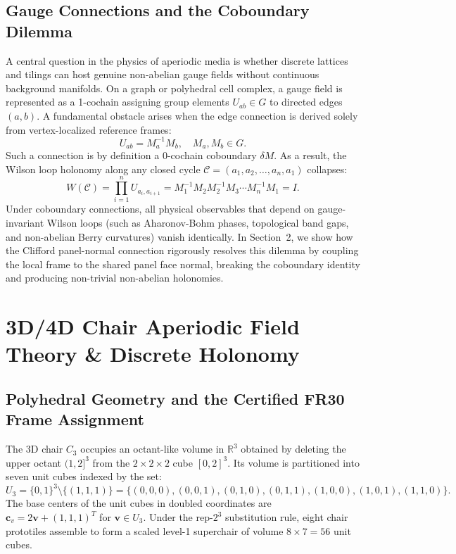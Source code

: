 \documentclass[11pt,a4paper]{article}
\theoremstyle{definition}
\newcommand{\R}{\mathbb{R}}
\begin{document}
\subsection{Gauge Connections and the Coboundary Dilemma}

A central question in the physics of aperiodic media is whether discrete lattices and tilings can host genuine non-abelian gauge fields without continuous background manifolds. On a graph or polyhedral cell complex, a gauge field is represented as a 1-cochain assigning group elements $U_{ab} \in G$ to directed edges $(a, b)$. A fundamental obstacle arises when the edge connection is derived solely from vertex-localized reference frames:
\begin{equation}
U_{ab} = M_a^{-1} M_b, \quad M_a, M_b \in G.
\end{equation}
Such a connection is by definition a 0-cochain coboundary $\delta M$. As a result, the Wilson loop holonomy along any closed cycle $\mathcal{C} = (a_1, a_2, \dots, a_n, a_1)$ collapses:
\begin{equation}
W(\mathcal{C}) = \prod_{i=1}^n U_{a_i, a_{i+1}} = M_1^{-1} M_2 M_2^{-1} M_3 \cdots M_n^{-1} M_1 = I.
\end{equation}
Under coboundary connections, all physical observables that depend on gauge-invariant Wilson loops (such as Aharonov-Bohm phases, topological band gaps, and non-abelian Berry curvatures) vanish identically. In Section~2, we show how the Clifford panel-normal connection rigorously resolves this dilemma by coupling the local frame to the shared panel face normal, breaking the coboundary identity and producing non-trivial non-abelian holonomies.

\section{3D/4D Chair Aperiodic Field Theory \& Discrete Holonomy}

\subsection{Polyhedral Geometry and the Certified FR30 Frame Assignment}

The 3D chair $C_3$ occupies an octant-like volume in $\R^3$ obtained by deleting the upper octant $(1,2]^3$ from the $2\times 2\times 2$ cube $[0,2]^3$. Its volume is partitioned into seven unit cubes indexed by the set:
\begin{equation}
U_3 = \{0, 1\}^3 \setminus \{(1, 1, 1)\} = \{(0,0,0), (0,0,1), (0,1,0), (0,1,1), (1,0,0), (1,0,1), (1,1,0)\}.
\end{equation}
The base centers of the unit cubes in doubled coordinates are $\mathbf{c}_v = 2\mathbf{v} + (1,1,1)^T$ for $\mathbf{v} \in U_3$. Under the rep-$2^3$ substitution rule, eight chair prototiles assemble to form a scaled level-1 superchair of volume $8 \times 7 = 56$ unit cubes.
\end{document}
